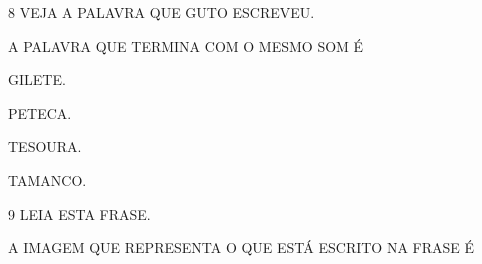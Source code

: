 \vspace{0.5cm}

\num{8} VEJA A PALAVRA QUE GUTO ESCREVEU.

\begin{myquote}
\end{myquote}

A PALAVRA QUE TERMINA COM O MESMO SOM É

\begin{multicols}{2}
\begin{escolha}%
\item GILETE.

\item PETECA.

\item TESOURA.

\item TAMANCO.
\end{escolha}
\end{multicols}

\num{9} LEIA ESTA FRASE.

\begin{myquote}
\large{}
\end{myquote}

A IMAGEM QUE REPRESENTA O QUE ESTÁ ESCRITO NA FRASE É

